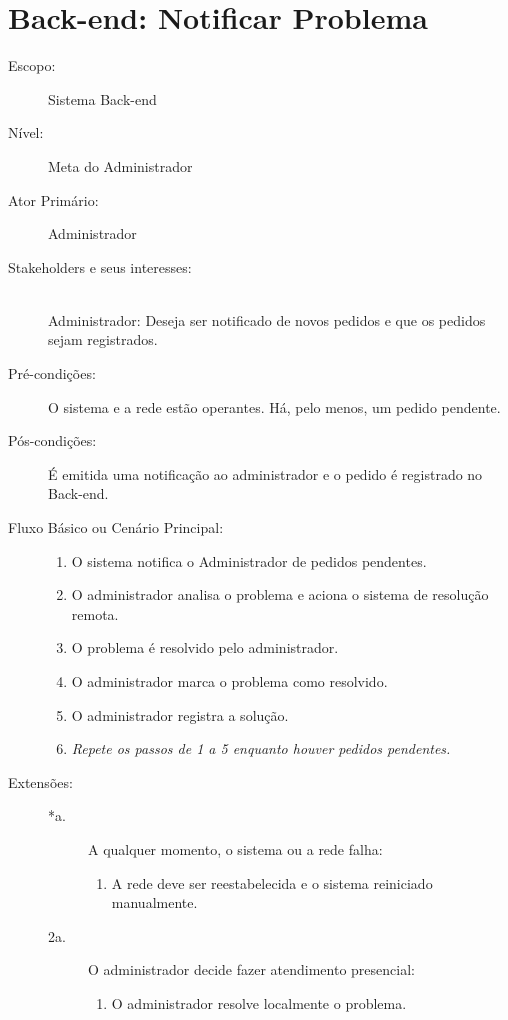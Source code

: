 \documentclass[brazil]{abnt}
\begin{document}
\section{Back-end: Notificar Problema}
\begin{description}
\item[Escopo:] Sistema Back-end
\item[Nível:] Meta do Administrador
\item[Ator Primário:] Administrador
\item[Stakeholders e seus interesses:] \hfill \\
Administrador: Deseja ser notificado de novos pedidos e que os pedidos
sejam registrados.
\item[Pré-condições:] O sistema e a rede estão operantes. Há, pelo menos, um pedido 
pendente.
\item[Pós-condições:]  É emitida uma notificação ao administrador e o pedido é        
registrado no Back-end.
\item[Fluxo Básico ou Cenário Principal:]\hfill
\begin{enumerate}
  \item O sistema notifica o Administrador de pedidos pendentes.
  \item O administrador analisa o problema e aciona o sistema de resolução
  remota.
  \item O problema é resolvido pelo administrador.
  \item O administrador marca o problema como resolvido.
  \item O administrador registra a solução.
  \item \emph{Repete os passos de 1 a 5 enquanto houver pedidos pendentes.}
\end{enumerate}

\item[Extensões:]\hfill
\begin{description}
	\item[*a.] A qualquer momento, o sistema ou a rede falha: \hfill
	\begin{enumerate}
 		\item A rede deve ser reestabelecida e o sistema
 		reiniciado manualmente.
	\end{enumerate} 

	\item[2a.] O administrador decide fazer atendimento presencial:
	\begin{enumerate}
  		\item O administrador resolve localmente o problema.
	\end{enumerate}


\end{description}
\end{description}
\end{document}
